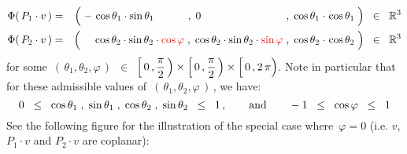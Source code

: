 \begin{eqnarray*}
\Phi(\,P_{1}\cdot v\,)
& = &
	\left(\;
		-\,\cos\theta_{1}\cdot\sin\theta_{1}{\color{white}\cdot\cos\varphi.}
		\; , \;
		0{\color{white}\cos\theta_{1}\cdot\sin\theta_{1}........}
		\; , \;
		\cos\theta_{1}\overset{{\color{white}1}}{\cdot}\cos\theta_{1}
		\;\right)
	\;\;\in\;\; \Re^{3}
\\
\Phi(\,P_{2}\cdot v\,)
& = &
	\left(\;
		{\color{white}-}\,\cos\theta_{2}\cdot\sin\theta_{2}\cdot{\color{red}\cos\varphi}
		\; , \;
		\cos\theta_{2}\cdot\sin\theta_{2}\cdot{\color{red}\sin\varphi}
		\; , \;
		\cos\theta_{2}\overset{{\color{white}1}}{\cdot}\cos\theta_{2}
		\;\right)
	\;\;\in\;\; \Re^{3}
\end{eqnarray*}
for some \,$(\,\theta_{1}, \theta_{2},\varphi\,)$ \,$\in$\,
$\left[\,0\,,\dfrac{\pi}{2}\,\right) \times \left[\,0\,,\dfrac{\pi}{2}\,\right) \times \left[\,0\,,\overset{{\color{white}.}}{2\,\pi}\right)$.
Note in particular that for these admissible values of \,$(\,\theta_{1}, \theta_{2},\varphi\,)$\,, we have:
\begin{equation}\label{sineCosineRestrictions}
0
\;\; \leq \;\;
	\cos\theta_{1} \; , \; \sin\theta_{1} \; , \; \cos\theta_{2} \; , \; \sin\theta_{2}
\;\; \leq \;\;
	1\,,
\quad\quad\textnormal{and}\quad\quad
-1
\;\; \leq \;\;
	\cos\varphi
\;\; \leq \;\;
	1
\end{equation}
\vskip 0.5cm
\noindent
See the following figure for the illustration of the special case where \,$\varphi = 0$ (i.e. $v$, $P_{1}\cdot v$ and $P_{2}\cdot v$ are coplanar):
